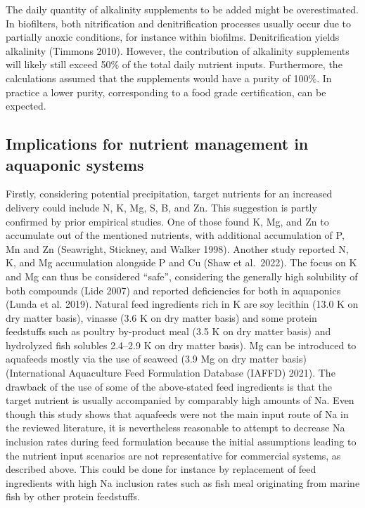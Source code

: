 \documentclass[preprint, 3p,
authoryear]{elsarticle} %
\begin{document}
The daily quantity of alkalinity supplements to be added might be
overestimated. In biofilters, both nitrification and denitrification
processes usually occur due to partially anoxic conditions, for instance
within biofilms. Denitrification yields alkalinity (Timmons 2010).
However, the contribution of alkalinity supplements will likely still
exceed 50\% of the total daily nutrient inputs. Furthermore, the
calculations assumed that the supplements would have a purity of 100\%.
In practice a lower purity, corresponding to a food grade certification,
can be expected.

\hypertarget{implications-for-nutrient-management-in-aquaponic-systems}{%
\subsection{Implications for nutrient management in aquaponic
systems}\label{implications-for-nutrient-management-in-aquaponic-systems}}

Firstly, considering potential precipitation, target nutrients for an
increased delivery could include N, K, Mg, S, B, and Zn. This suggestion
is partly confirmed by prior empirical studies. One of those found K,
Mg, and Zn to accumulate out of the mentioned nutrients, with additional
accumulation of P, Mn and Zn (Seawright, Stickney, and Walker 1998).
Another study reported N, K, and Mg accumulation alongside P and Cu
(Shaw et al.~2022). The focus on K and Mg can thus be considered
``safe'', considering the generally high solubility of both compounds
(Lide 2007) and reported deficiencies for both in aquaponics (Lunda et
al. 2019). Natural feed ingredients rich in K are soy lecithin
(\SI{13.0}{\p} K on dry matter basis), vinasse (\SI{3.6}{\p} K on dry
matter basis) and some protein feedstuffs such as poultry by-product
meal (\SI{3.5}{\p} K on dry matter basis) and hydrolyzed fish solubles
\SIrange{2.4}{2.9}{\p} K on dry matter basis). Mg can be introduced to
aquafeeds mostly via the use of seaweed (\SI{3.9}{\p} Mg on dry matter
basis) (International Aquaculture Feed Formulation Database (IAFFD)
2021). The drawback of the use of some of the above-stated feed
ingredients is that the target nutrient is usually accompanied by
comparably high amounts of Na. Even though this study shows that
aquafeeds were not the main input route of Na in the reviewed
literature, it is nevertheless reasonable to attempt to decrease Na
inclusion rates during feed formulation because the initial assumptions
leading to the nutrient input scenarios are not representative for
commercial systems, as described above. This could be done for instance
by replacement of feed ingredients with high Na inclusion rates such as
fish meal originating from marine fish by other protein feedstuffs.
\end{document}
